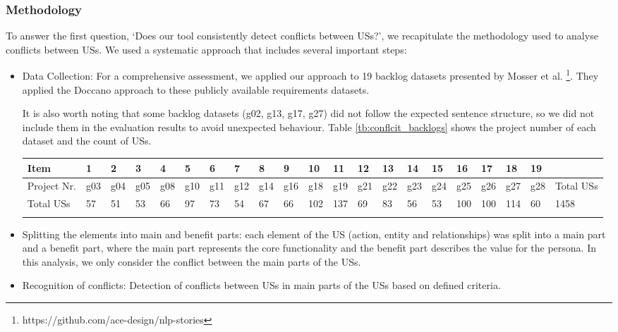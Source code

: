 \subsubsection*{Methodology}
To answer the first question, ‘Does our tool consistently detect conflicts between USs?’, we recapitulate the methodology used to analyse conflicts between USs. We used a systematic approach that includes several important steps:
\begin{itemize}
	
	\item Data Collection: For a comprehensive assessment, we applied our approach to 19 backlog datasets presented by Mosser et al. \footnote{https://github.com/ace-design/nlp-stories}. They applied the Doccano approach to these publicly available requirements datasets\cite{requirementsdatasets}.
	
	 It is also worth noting that some backlog datasets (g02, g13, g17, g27) did not follow the expected sentence structure, so we did not include them in the evaluation results to avoid unexpected behaviour. Table \ref{tb:conflcit_backlogs} shows the project number of each dataset and the count of USs.
	\begingroup
	\centering
	\scriptsize
	\renewcommand{\arraystretch}{1.5} 
	\begin{tabularx}{\linewidth}{l|XXXXXXXXXXXXXXXXXXX|X}
		Item&	1&	2&	3&	4&	5&	6&	7&	8&	9&	10&	11&	12&	13&	14&	15&	16&	17&	18&	19&	\\
		\hline
		Project Nr.&	g03	&g04	&g05	&g08	&g10	&g11	&g12	&g14	&g16	&g18	&g19	&g21	&g22	&g23	&g24	&g25	&g26	&g27	&g28	&Total USs\\
		\hline
		Total USs&	57&	51	&53	&66	&97	&73	&54	&67	&66	&102	&137	&69	&83	&56	&53	&100	&100	&114	&60	&1458 \\
		\caption{Project number and count of USs contained in each backlog dataset}\label{tb:conflcit_backlogs}
	\end{tabularx}	
	\endgroup
	\item Splitting the elements into main and benefit parts: each element of the US (action, entity and relationships) was split into a main part and a benefit part, where the main part represents the core functionality and the benefit part describes the value for the persona. In this analysis, we only consider the conflict between the main parts of the USs.
	
	\item Recognition of conflicts: Detection of conflicts between USs in main parts of the USs based on defined criteria.
	
\end{itemize}
